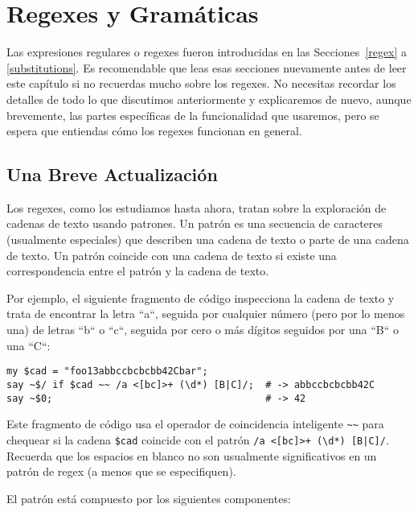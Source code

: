 


\chapter{Regexes y Gramáticas}
\label{regex_grammars}

Las expresiones regulares o regexes fueron introducidas en las
Secciones~\ref{regex} a \ref{substitutions}. Es recomendable que leas
esas secciones nuevamente antes de leer este capítulo si no 
recuerdas mucho sobre los regexes. No necesitas recordar los detalles
de todo lo que discutimos anteriormente y explicaremos de nuevo, aunque
brevemente, las partes específicas de la funcionalidad que usaremos,
pero se espera que entiendas cómo los regexes funcionan en general.

\section{Una Breve Actualización}

Los regexes, como los estudiamos hasta ahora, tratan sobre
la exploración de cadenas de texto usando patrones. 
Un patrón es una secuencia de caracteres (usualmente especiales)
que describen una cadena de texto o parte de una 
cadena de texto. Un patrón coincide con una cadena de texto si existe
una correspondencia entre el patrón y la cadena de texto.

Por ejemplo, el siguiente fragmento de código inspecciona la 
cadena de texto y trata de encontrar la letra ``a``, seguida por 
cualquier número (pero por lo menos una) de letras ``b`` o ``c``,
seguida por cero o más dígitos seguidos por una ``B`` o una ``C``:

\begin{lstlisting}
my $cad = "foo13abbccbcbcbb42Cbar";
say ~$/ if $cad ~~ /a <[bc]>+ (\d*) [B|C]/;  # -> abbccbcbcbb42C
say ~$0;                                     # -> 42
\end{lstlisting}

Este fragmento de código usa el operador de coincidencia 
inteligente \verb|~~| para chequear si la cadena \verb|$cad|
coincide con el patrón \verb'/a <[bc]>+ (\d*) [B|C]/'. Recuerda
que los espacios en blanco no son usualmente significativos en 
un patrón de regex (a menos que se especifiquen).

El patrón está compuesto por los siguientes componentes:

